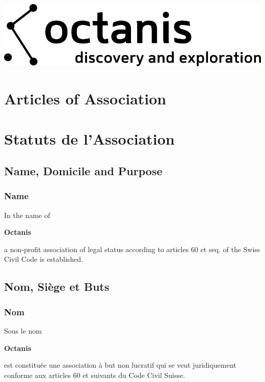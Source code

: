 \documentclass[12pt,a4paper,oneside]{article}
\newcounter{art}
\newcommand{\english}{    \switchcolumn[0]\noindent}
\newcommand{\french}{    \switchcolumn[1]\noindent}
\begin{document}
\begin{center}
	\includegraphics{octanis_org_logo_large}
\end{center}

\begin{paracol}{2}\sloppy



\english
	\section*{Articles of Association}
 	
\french
	\section*{Statuts de l’Association}




\english
	\subsection{Name, Domicile and Purpose}
	\subsubsection{Name}
	In the name of
	\begin{center}
		\textbf{Octanis}
	\end{center}
	a non-profit association of legal status according to articles 60 et  seq.  of  the  Swiss  Civil  Code is established.

\french
	\subsection{Nom, Siège et Buts}
	\subsubsection{Nom}
	Sous le nom 
	\begin{center}
		\textbf{Octanis}
	\end{center}
	est constituée une association à but non lucratif qui se veut juridiquement conforme aux articles 60 et suivants du Code Civil Suisse.



\end{paracol}
\end{document}
